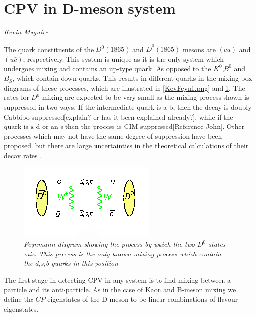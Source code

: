 \section{CPV in D-meson system}
\vspace{-1.0em}
\begin{center}
\tiny{\textit{Kevin Maguire}}
\end{center}

The quark constituents of the $D^{0}(1865)$ and $\bar{D}^{0}(1865)$ mesons are $(c \bar{u})$ and $(u \bar{c})$, respectively. This system is unique as it is the only system which undergoes mixing and contains an up-type quark. As opposed to the $K^{0}$,$B^{0}$ and $B_{S}$, which contain down quarks. This results in different quarks in the mixing box diagrams of these processes, which are illustrated in \cref{KevFeyn1.png} and \cref{Deon_Mixing_Feyn}. The rates for $D^0$ mixing are expected to be very small as the mixing process shown is suppressed in two ways. If the intermediate quark is a b, then the decay is doubly Cabbibo suppressed[explain? or has it been explained already?], while if the quark is a d or an s then the process is GIM suppressed[Reference John]. Other processes which may not have the same degree of suppression have been proposed, but there are large uncertainties in the theoretical calculations of their decay rates \cite{Babar_D0_Review}.    

\begin{figure}[h!]
\begin{center}
\includegraphics[scale=0.8]{figs/Deon_mixing_feyn.png}
\end{center}
\caption{\textit{Feynmann diagram showing the process by which the two $D^{0}$ states mix. This process is the only known mixing process which contain the d,s,b quarks in this position \cite{Deon_Mixing_Feyn}}}
\label{Deon_Mixing_Feyn}
\end{figure}

The first stage in detecting CPV in any system is to find mixing between a particle and its anti-particle. As in the case of Kaon and B-meson mixing we define the $CP$ eigenstates of the D meson to be linear combinations of flavour eigenstates.


